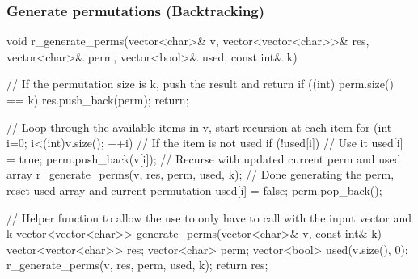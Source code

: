 \documentclass{report}
\begin{document}
\subsubsection{Generate permutations (Backtracking)}
\bigbreak \noindent 
\begin{cppcode}
    void r_generate_perms(vector<char>& v, vector<vector<char>>& res, vector<char>& perm, vector<bool>& used, const int& k) {
        // If the permutation size is k, push the result and return
        if ((int) perm.size() == k) {
            res.push_back(perm);
            return;
        }

        // Loop through the available items in v, start recursion at each item
        for (int i=0; i<(int)v.size(); ++i) {
            // If the item is not used
            if (!used[i]) {
                // Use it
                used[i] = true;
                perm.push_back(v[i]);
                // Recurse with updated current perm and used array
                r_generate_perms(v, res, perm, used, k);
                // Done generating the perm, reset used array and current permutation
                used[i] = false;
                perm.pop_back();
            }
        }
    }

    // Helper function to allow the use to only have to call with the input vector and k
    vector<vector<char>> generate_perms(vector<char>& v, const int& k) {
        vector<vector<char>> res; 
        vector<char> perm;
        vector<bool> used(v.size(), 0);
        r_generate_perms(v, res, perm, used, k);
        return res;
    }
\end{cppcode}
\end{document}

